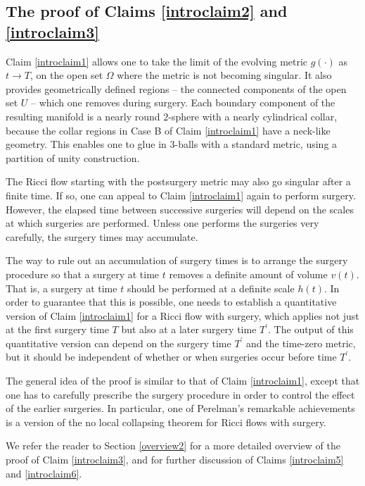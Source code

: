 \documentclass[12pt]{amsart}
\newcommand{\ra}{\rightarrow}
\numberwithin{equation}{section}
\theoremstyle{plain}
\theoremstyle{definition}
\theoremstyle{remark}
\begin{document}
\subsection{The proof of Claims \ref{introclaim2} and \ref{introclaim3}}
Claim \ref{introclaim1} allows one to take the limit of the evolving metric
$g(\cdot)$ as $t\ra T$, on the open set $\Omega$ where the metric is not
becoming singular.  It also provides geometrically defined regions -- the 
connected components of the open set $U$ -- which one removes during surgery.
Each boundary component of the resulting manifold is
a nearly round $2$-sphere with a nearly cylindrical collar,
because the collar regions in Case B of Claim \ref{introclaim1} have a neck-like
geometry.  This enables one to glue in $3$-balls with a standard 
metric, using a partition of unity  construction.

 
The Ricci flow starting with the postsurgery metric may also go singular after
a finite time. If so, one can appeal to Claim \ref{introclaim1} again to perform
surgery.  
However, the elapsed time between successive surgeries will depend on 
the scales at which surgeries are performed. Unless one performs
the surgeries very carefully, the surgery times may accumulate.

The way to rule out an accumulation of surgery times is to
arrange the surgery procedure so that a surgery at time $t$ removes a definite amount
of volume $v(t)$.  That is, a surgery at time $t$ should be performed at a
definite scale $h(t)$. In order to guarantee that this is possible, one needs to 
establish a
quantitative version of Claim \ref{introclaim1} for a Ricci flow with surgery,
which applies not just at the first surgery time $T$ but also at a later
surgery
time $T^\prime$. The output of this quantitative version can depend on 
the surgery time $T^\prime$
and the time-zero
metric, but it should be independent of whether or when surgeries occur 
before time $T^\prime$.

The 
general idea of the proof is similar to that of Claim \ref{introclaim1},
except that one has to carefully prescribe the surgery procedure in order
to control the effect of the earlier
surgeries. In particular, one of Perelman's
remarkable achievements is  a version of the no local collapsing theorem
for Ricci flows with surgery.


We refer the  reader to Section \ref{overview2} for a 
more detailed overview of the proof of Claim \ref{introclaim3}, and for 
further discussion of Claims \ref{introclaim5} and \ref{introclaim6}.
\end{document}
